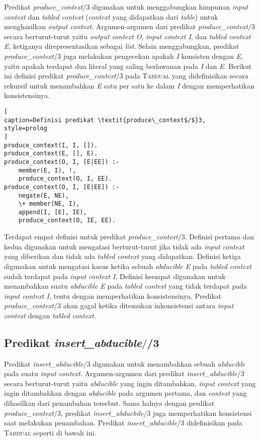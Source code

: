Predikat \textit{produce\_context$/$}3 digunakan untuk menggabungkan himpunan \textit{input context} dan \textit{tabled context} (\textit{context} yang didapatkan dari \textit{table}) untuk menghasilkan \textit{output context}. Argumen-argumen dari predikat \textit{produce\_context$/$}3 secara berturut-turut yaitu \textit{output context O}, \textit{input context I}, dan \textit{tabled context E}, ketiganya direpresentasikan sebagai \textit{list}. Selain menggabungkan, predikat \textit{produce\_context$/$}3 juga melakukan pengecekan apakah \textit{I} konsisten dengan \textit{E}, yaitu apakah terdapat dua literal yang saling berlawanan pada \textit{I} dan \textit{E}. Berikut ini definisi predikat \textit{produce\_context$/$}3 pada \textsc{Tabdual} yang didefinisikan secara rekursif untuk menambahkan \textit{E} satu per satu ke dalam \textit{I} dengan memperhatikan konsistensinya.
\\

\begin{lstlisting}[
caption=Definisi predikat \textit{produce\_context$/$}3,
style=prolog
]
produce_context(I, I, []).
produce_context(E, [], E).
produce_context(O, I, [E|EE]) :-
	member(E, I), !,
	produce_context(O, I, EE).
produce_context(O, I, [E|EE]) :-
	negate(E, NE),
	\+ member(NE, I),
	append(I, [E], IE),
	produce_context(O, IE, EE).
\end{lstlisting}

Terdapat empat definisi untuk predikat \textit{produce\_context$/$}3. Definisi pertama dan kedua digunakan untuk mengatasi berturut-turut jika tidak ada \textit{input context} yang diberikan dan tidak ada \textit{tabled context} yang didapatkan. Definisi ketiga digunakan untuk mengatasi kasus ketika sebuah \textit{abducible E} pada \textit{tabled context} sudah terdapat pada \textit{input context I}. Definisi keempat digunakan untuk menambahkan suatu \textit{abducible E} pada \textit{tabled context} yang tidak terdapat pada \textit{input context I}, tentu dengan memperhatikan konsistensinya. Predikat \textit{produce\_context$/$}3 akan gagal ketika ditemukan inkonsistensi antara \textit{input context} dengan \textit{tabled context}.

\subsection{Predikat \textit{insert\_abducible$/$}/3}

Predikat \textit{insert\_abducible$/$}3 digunakan untuk menambahkan sebuah \textit{abducible} pada suatu \textit{input context}. Argumen-argumen dari predikat \textit{insert\_abducible$/$}3 secara berturut-turut yaitu \textit{abducible} yang ingin ditambahkan, \textit{input context} yang ingin ditambahkan dengan \textit{abducible} pada argumen pertama, dan \textit{context} yang dihasilkan dari penambahan tersebut. Sama halnya dengan predikat \textit{produce\_context$/$}3, predikat \textit{insert\_abducbile$/$}3 juga memperhatikan konsistensi saat melakukan penambahan. Predikat \textit{insert\_abducible$/$}3 didefinisikan pada \textsc{Tabdual} seperti di bawah ini.
\\

